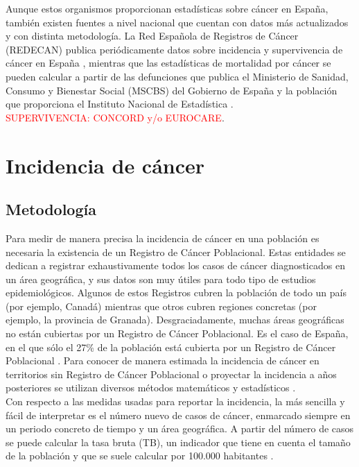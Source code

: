 Aunque estos organismos proporcionan estadísticas sobre cáncer en España, también existen fuentes a nivel nacional que cuentan con datos más actualizados y con distinta metodología. La Red Española de Registros de Cáncer (REDECAN) publica periódicamente datos sobre incidencia y supervivencia de cáncer en España \cite{REDECAN2020, Guevara2019}, mientras que las estadísticas de mortalidad por cáncer se pueden calcular a partir de las defunciones que publica el Ministerio de Sanidad, Consumo y Bienestar Social (MSCBS) del Gobierno de España \cite{MSCBS} y la población que proporciona el Instituto Nacional de Estadística \cite{INEpob}.\\

\textcolor{red}{SUPERVIVENCIA: CONCORD y/o EUROCARE}.


\section{Incidencia de cáncer}

\subsection{Metodología}

Para medir de manera precisa la incidencia de cáncer en una población es necesaria la existencia de un Registro de Cáncer Poblacional. Estas entidades se dedican a registrar exhaustivamente todos los casos de cáncer diagnosticados en un área geográfica, y sus datos son muy útiles para todo tipo de estudios epidemiológicos. Algunos de estos Registros cubren la población de todo un país (por ejemplo, Canadá) mientras que otros cubren regiones concretas (por ejemplo, la provincia de Granada). Desgraciadamente, muchas áreas geográficas no están cubiertas por un Registro de Cáncer Poblacional. Es el caso de España, en el que sólo el 27\% de la población está cubierta por un Registro de Cáncer Poblacional \cite{Redondo-Sanchez2019}. Para conocer de manera estimada la incidencia de cáncer en territorios sin Registro de Cáncer Poblacional o proyectar la incidencia a años posteriores se utilizan diversos métodos matemáticos y estadísticos \cite{Bray2018, GCO, ECIS, ECIS2, REDECAN2020, Redondo-Sanchez2019}.\\

Con respecto a las medidas usadas para reportar la incidencia, la más sencilla y fácil de interpretar es el número nuevo de casos de cáncer, enmarcado siempre en un periodo concreto de tiempo y un área geográfica. A partir del número de casos se puede calcular la tasa bruta (TB), un indicador que tiene en cuenta el tamaño de la población y que se suele calcular por 100.000 habitantes \cite{IARC1995}.\\

